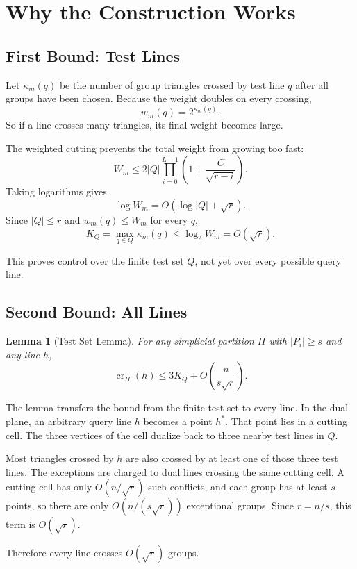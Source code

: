 \documentclass[11pt,a4paper]{article}
\newtheorem{lemma}[theorem]{Lemma}
\begin{document}
\section{Why the Construction Works}
\label{sec:correctness}

\subsection{First Bound: Test Lines}

Let $\kappa_m(q)$ be the number of group triangles crossed by test
line $q$ after all groups have been chosen. Because the weight doubles
on every crossing,
\[
  w_m(q)=2^{\kappa_m(q)}.
\]
So if a line crosses many triangles, its final weight becomes large.

The weighted cutting prevents the total weight from growing too fast:
\[
  W_m
  \le
  2|Q|
  \prod_{i=0}^{L-1}
  \left(1+\frac{C}{\sqrt{r-i}}\right).
\]
Taking logarithms gives
\[
  \log W_m=O(\log |Q|+\sqrt r).
\]
Since $|Q|\le r$ and $w_m(q)\le W_m$ for every $q$,
\[
  K_Q
  =
  \max_{q\in Q}\kappa_m(q)
  \le
  \log_2 W_m
  =
  O(\sqrt r).
\]

This proves control over the finite test set $Q$, not yet over every
possible query line.

\subsection{Second Bound: All Lines}

\begin{lemma}[Test Set Lemma]
\label{lem:testset}
For any simplicial partition $\Pi$ with $|P_i|\ge s$ and any line
$h$,
\[
  \operatorname{cr}_\Pi(h)
  \le
  3K_Q
  +
  O\!\left(\frac{n}{s\sqrt r}\right).
\]
\end{lemma}

The lemma transfers the bound from the finite test set to every line.
In the dual plane, an arbitrary query line $h$ becomes a point $h^*$.
That point lies in a cutting cell. The three vertices of the cell
dualize back to three nearby test lines in $Q$.

Most triangles crossed by $h$ are also crossed by at least one of
those three test lines. The exceptions are charged to dual lines
crossing the same cutting cell. A cutting cell has only
$O(n/\sqrt r)$ such conflicts, and each group has at least $s$ points,
so there are only $O(n/(s\sqrt r))$ exceptional groups. Since
$r=n/s$, this term is $O(\sqrt r)$.

Therefore every line crosses $O(\sqrt r)$ groups.
\end{document}
